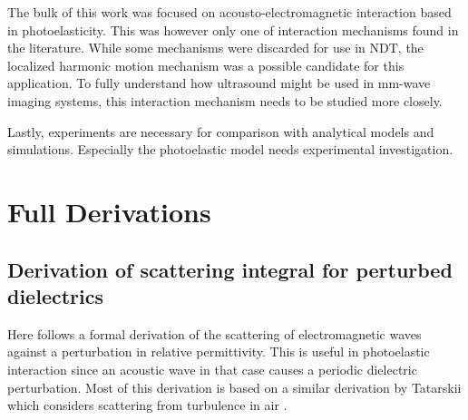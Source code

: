 \documentclass[11pt,twoside]{eitExjobb}
\begin{document}
	The bulk of this work was focused on acousto-electromagnetic interaction based in photoelasticity. This was however only one of interaction mechanisms found in the literature. While some mechanisms were discarded for use in NDT, the localized harmonic motion mechanism was a possible candidate for this application. To fully understand how ultrasound might be used in mm-wave imaging systems, this interaction mechanism needs to be studied more closely.
	
	Lastly, experiments are necessary for comparison with analytical models and simulations. Especially the photoelastic model needs experimental investigation.
	
	
	
	
	\appendix
	
	\chapter{Full Derivations} \label{ch:derivations}
	
	\section{Derivation of scattering integral for perturbed dielectrics \label{sec:app-derivations-scatter}}
	Here follows a formal derivation of the scattering of electromagnetic waves against a perturbation in relative permittivity. This is useful in photoelastic interaction since an acoustic wave in that case causes a periodic dielectric perturbation. Most of this derivation is based on a similar derivation by Tatarskii which considers scattering from turbulence in air \cite{Tatarskii1971}.
	
\end{document}
